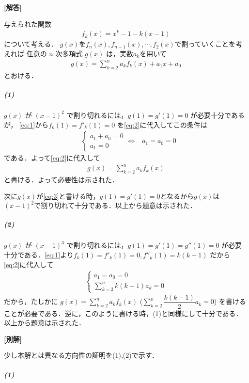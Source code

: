 \documentclass[../../main.tex]{subfiles}
\begin{document}
\begin{oframed}
  
\end{oframed}

{\bf [解答]}

与えられた関数
\begin{align}
  f_k(x) = x^k - 1 - k(x-1) \label{eq:1}
\end{align}
について考える．
$g(x)$を$f_n(x),f_{n-1}(x),\cdots,f_2(x)$で割っていくことを考えれば
任意の $n$ 次多項式 $g(x)$ は，実数$a_k$を用いて
\begin{align}
  g(x) = \sum_{k=2}^n a_k f_k(x) + a_1 x + a_0 \label{eq:2}
\end{align}
とおける．

\subparagraph{(1)}

$g(x)$ が $(x-1)^2$ で割り切れるには，$g(1)=g'(1)=0$ が必要十分であるが，
\cref{eq:1}から$f_k(1)=f'_k(1)=0$ を\cref{eq:2}に代入してこの条件は
\begin{align}
  &
  \begin{cases}
    a_1 + a_0 = 0 \\
    a_1 = 0
  \end{cases}
  \iff
  & a_1 = a_0 = 0
\end{align}
である．よって\cref{eq:2}に代入して
\begin{align}
  g(x) = \sum_{k=2}^n a_k f_k(x) \label{eq:3}
\end{align}
と書ける．よって必要性は示された．

次に$g(x)$が\cref{eq:3}と書ける時，$g(1)=g'(1)=0$となるから$g(x)$は$(x-1)^2$で割り切れて十分である．以上から題意は示された．

\subparagraph{(2)}

$g(x)$ が $(x-1)^3$ で割り切れるには，$g(1)=g'(1)=g''(1)=0$ が必要十分である．\cref{eq:1}より$f_k(1)=f'_k(1)=0, f''_k(1)=k(k-1)$ だから
\cref{eq:2}に代入して
\begin{align}
  \begin{cases} a_1 = a_0 = 0 \\ \sum_{k=2}^n k(k-1) a_k = 0
  \end{cases}
\end{align}
だから，たしかに $g(x) = \sum_{k=2}^n a_k f_k(x)$ ($\sum_{k=2}^n \dfrac{k(k-1)}{2} a_k = 0$) を書けることが必要である．逆に，このように書ける時，(1)と同様にして十分である．以上から題意は示された．

{\bf [別解]}

少し本解とは異なる方向性の証明を(1),(2)で示す．

\subparagraph{(1)}
\end{document}
